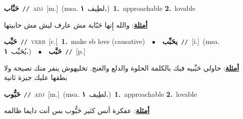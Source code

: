 \documentclass[10pt,a4paper,twoside]{article} %
\begin{document}
\begin{multicols}{2}
{\setlength\topsep{0pt}\textbf{\foreignlanguage{arabic}{حَبَّاب}}\ {\color{gray}\texttt{//}\color{black}}\ \textsc{adj}\ [m.]\ \color{gray}(msa. \foreignlanguage{arabic}{لطِيف}~\foreignlanguage{arabic}{\textbf{١.}})\color{black}\ \textbf{1.}~approachable  \textbf{2.}~lovable\  \begin{flushright}\color{gray}\foreignlanguage{arabic}{\textbf{\underline{\foreignlanguage{arabic}{أمثلة}}}: والله إِنها حَبّابة مش عارف ليش مش حابيتها}\end{flushright}\color{black}} \vspace{2mm}

{\setlength\topsep{0pt}\textbf{\foreignlanguage{arabic}{حَبِّب}}\ {\color{gray}\texttt{//}\color{black}}\ \textsc{verb}\ [c.]\ \textbf{1.}~make sb love (causative)\ \ $\bullet$\ \ \setlength\topsep{0pt}\textbf{\foreignlanguage{arabic}{يحَبِّب}}\ {\color{gray}\texttt{//}\color{black}}\ [i.]\ \color{gray}(msa. \foreignlanguage{arabic}{يُحَبِّب}~\foreignlanguage{arabic}{\textbf{١.}})\color{black}\ \ $\bullet$\ \ \setlength\topsep{0pt}\textbf{\foreignlanguage{arabic}{حَبَّب}}\ {\color{gray}\texttt{//}\color{black}}\ [p.]\  \begin{flushright}\color{gray}\foreignlanguage{arabic}{\textbf{\underline{\foreignlanguage{arabic}{أمثلة}}}: حاولي حَبِّبيه فيك بالكلمة الحلوة والدلع والغنج. تخليهوش ينفر منك نصيحة ولا بطقها عليك جيزة ثانية}\end{flushright}\color{black}} \vspace{2mm}

{\setlength\topsep{0pt}\textbf{\foreignlanguage{arabic}{حَبُّوب}}\ {\color{gray}\texttt{//}\color{black}}\ \textsc{adj}\ [m.]\ \color{gray}(msa. \foreignlanguage{arabic}{لطِيف}~\foreignlanguage{arabic}{\textbf{١.}})\color{black}\ \textbf{1.}~approachable  \textbf{2.}~lovable\  \begin{flushright}\color{gray}\foreignlanguage{arabic}{\textbf{\underline{\foreignlanguage{arabic}{أمثلة}}}: عفكرة أنس كثير حَبُّوب بس أنت دايما ظالمه}\end{flushright}\color{black}} \vspace{2mm}


\end{multicols}
\end{document}
